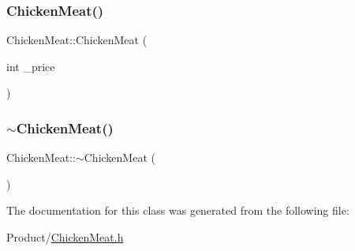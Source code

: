 \mbox{\label{classChickenMeat_a93b9ad839f77e1b1dbade099d73c1607}} 
\subsubsection{\texorpdfstring{ChickenMeat()}{ChickenMeat()}\hspace{0.1cm}{\footnotesize\ttfamily [2/2]}}
{\footnotesize\ttfamily Chicken\+Meat\+::\+Chicken\+Meat (\begin{DoxyParamCaption}\item[{int}]{\+\_\+price }\end{DoxyParamCaption})}

\mbox{\label{classChickenMeat_a52fb9da066eb48d5cfb45aa3bfd77129}} 
\subsubsection{\texorpdfstring{$\sim$ChickenMeat()}{~ChickenMeat()}}
{\footnotesize\ttfamily Chicken\+Meat\+::$\sim$\+Chicken\+Meat (\begin{DoxyParamCaption}{ }\end{DoxyParamCaption})}



The documentation for this class was generated from the following file\+:\begin{DoxyCompactItemize}
\item 
Product/\mbox{\hyperlink{ChickenMeat_8h}{Chicken\+Meat.\+h}}\end{DoxyCompactItemize}
